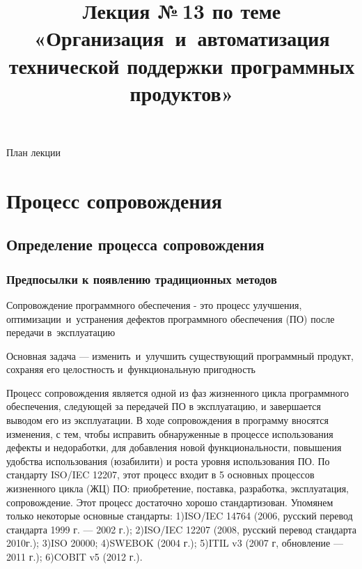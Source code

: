 \documentclass{../industrial-development}
\title{Лекция №\,13 по теме «Организация~и~автоматизация технической поддержки программных продуктов»}
\author{ }
\date{}
\begin{document}
\begin{frame}
  \titlepage
\end{frame}

\begin{frame}{План лекции}
  \tableofcontents
\end{frame}  

\section{Процесс сопровождения}
\subsection{Определение процесса сопровождения}


\begin{frame} \frametitle{Предпосылки к появлению традиционных методов}

	\begin{definition}
		\alert{Сопровождение программного обеспечения} 
		  - это процесс улучшения, оптимизации~и~устранения дефектов программного обеспечения (ПО) после передачи в~эксплуатацию
	\end{definition}
	
	Основная задача --- изменить~и~улучшить существующий программный продукт, сохраняя его целостность и~функциональную пригодность
	
\end{frame}

\lecturenotes
Процесс сопровождения является одной из фаз жизненного цикла программного обеспечения, следующей за передачей ПО в эксплуатацию, и завершается выводом его из эксплуатации. В ходе сопровождения в программу вносятся изменения, с тем, чтобы исправить обнаруженные в процессе использования дефекты и недоработки, для добавления новой функциональности, повышения удобства использования (юзабилити) и роста уровня использования ПО. По стандарту ISO/IEC 12207, этот процесс входит в 5 основных процессов жизненного цикла (ЖЦ) ПО: приобретение, поставка, разработка, эксплуатация, сопровождение. 
Этот процесс достаточно хорошо стандартизован. Упомянем только некоторые основные стандарты:
1)ISO/IEC 14764 (2006, русский перевод стандарта 1999 г. — 2002 г.);
2)ISO/IEC 12207 (2008, русский перевод стандарта 2010г.);
3)ISO 20000;
4)SWEBOK (2004 г.);
5)ITIL v3 (2007 г, обновление — 2011 г.);
6)COBIT v5 (2012 г.).


\end{document}
